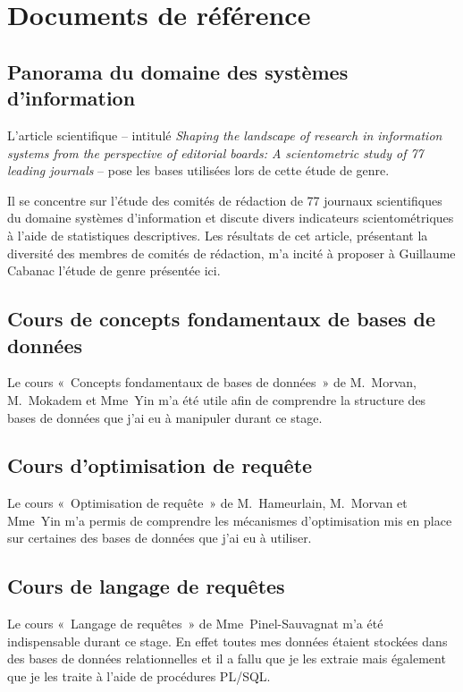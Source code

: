 \cleardoublepage
{} 

\chapter{Documents de référence}


	
	\section{Panorama du domaine des systèmes d'information \citep{shaping}}
		L'article scientifique \citep{shaping} -- intitulé 
\textit{Shaping the landscape of research in information systems from the perspective of editorial boards: A scientometric study of 77 leading journals}
 -- pose les bases utilisées lors de cette étude de genre.
		
		Il se concentre sur l\rq{}étude des comités de rédaction de 77 journaux scientifiques du domaine systèmes d'information et discute divers indicateurs scientométriques à l\rq{}aide de statistiques descriptives. Les résultats de cet article, présentant la diversité des membres de comités de rédaction, m\rq{}a incité à proposer à Guillaume Cabanac l\rq{}étude de genre présentée ici.
		
		
	\section{Cours de concepts fondamentaux de bases de données}
		Le cours «~Concepts fondamentaux de bases de données~» de M.~Morvan, M.~Mokadem et Mme~Yin m'a été utile afin de comprendre la structure des bases de données que j'ai eu à manipuler durant ce stage.
		
		
	\section{Cours d'optimisation de requête}
		Le cours «~Optimisation de requête~» de M.~Hameurlain, M.~Morvan et Mme~Yin m'a permis de comprendre les mécanismes d'optimisation mis en place sur certaines des bases de données que j'ai eu à utiliser.


	\section{Cours de langage de requêtes}
	Le cours «~Langage de requêtes~» de Mme~Pinel-Sauvagnat m'a été indispensable durant ce stage. En effet toutes mes données étaient stockées dans des bases de données relationnelles et il a fallu que je les extraie mais également que je les traite à l'aide de procédures PL/SQL.
	
